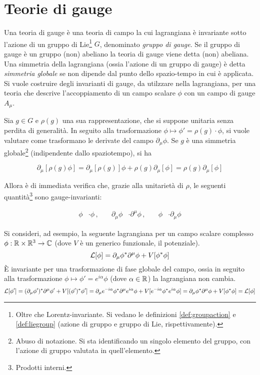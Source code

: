 \chapter{Teorie di gauge}

Una teoria di gauge è una teoria di campo la cui lagrangiana è invariante sotto
l'azione di un gruppo di Lie\footnote{
   Oltre che Lorentz-invariante.
   Si vedano le definizioni \ref{def:groupaction} e \ref{def:liegroup}
   (azione di gruppo e gruppo di Lie, rispettivamente).
} $G$, denominato \emph{gruppo di gauge}. Se il gruppo di gauge è un gruppo (non)
abeliano la teoria di gauge viene detta (non) abeliana.\\

Una simmetria della lagrangiana (ossia  l'azione di un gruppo di gauge) è detta
\emph{simmetria globale} se non dipende dal punto dello spazio-tempo in cui è applicata.\\

Si vuole costruire degli invarianti di gauge, da utilzzare nella lagrangiana,
per una teoria che descrive l'accoppiamento di un campo scalare $\phi$ con un campo
di gauge $A_\mu$.

Sia $g \in G$ e $\rho(g)$ una sua
rappresentazione, che si suppone unitaria senza perdita di generalità.
In seguito alla trasformazione $\phi \mapsto  \phi' = \rho(g) \cdot \phi$,
si vuole valutare come trasformano le derivate del campo $\partial _\mu \phi$.
Se $g$ è una simmetria globale\footnote{
   Abuso di notazione. Si sta identificando un singolo elemento del gruppo, con
   l'azione di gruppo valutata in quell'elemento.
} (indipendente dallo spaziotempo), si ha

$$
   \partial _\mu [\rho(g) \phi]
      = \partial _\mu [\rho(g)] \phi + \rho(g) \partial _\mu [\phi]
      = \rho(g) \partial _\mu [\phi]
$$

Allora è di immediata verifica che, grazie alla unitarietà di $\rho$, le seguenti
quantità\footnote{Prodotti interni.} sono gauge-invarianti:

\begin{equation*}
   \begin{aligned}
      \phi & \cdot \phi \,,& \quad
      \partial _\mu \phi & \cdot \partial ^\mu \phi \,,& \quad
      \phi & \cdot \partial _\mu \phi
   \end{aligned}
\end{equation*}

Si consideri, ad esempio, la seguente lagrangiana per un campo scalare complesso
$\phi : \mathbb{R} \times \mathbb{R}^3 \to \mathbb{C}$ (dove $V$ è un generico funzionale, il potenziale).
$$
   \mathcal{L} [\phi] = \partial _\mu \phi^*  \partial ^\mu \phi + V[\phi ^* \phi]
$$
È invariante per una trasformazione di fase globale del campo, ossia in seguito
alla trasformazione
$
  \phi \mapsto \phi' = e^{i \alpha}\phi
$
(dove $\alpha \in \mathbb{R}$) la lagrangiana non cambia.
$$
   \mathcal{L} [\phi'] = (\partial _\mu \phi')^*  \partial ^\mu \phi' + V[(\phi')^* \phi']
                = \partial _\mu  e^{-i \alpha}\phi^*  \partial ^\mu  e^{i \alpha}\phi
                   +  V[e^{-i \alpha}\phi ^*  e^{i \alpha}\phi]
                = \partial _\mu \phi^*  \partial ^\mu \phi + V[\phi ^* \phi]
                = \mathcal{L} [\phi]
$$

